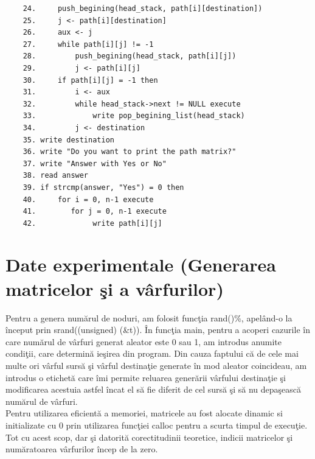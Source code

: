 \documentclass{article}
\begin{document}
\begin{itemize}
\begin{lstlisting}
    24.     push_begining(head_stack, path[i][destination])
    25.     j <- path[i][destination]
    26.     aux <- j
    27.     while path[i][j] != -1
    28.         push_begining(head_stack, path[i][j])
    29.         j <- path[i][j]
    30.     if path[i][j] = -1 then
    31.         i <- aux
    32.         while head_stack->next != NULL execute
    33.             write pop_begining_list(head_stack)
    34.         j <- destination
    35. write destination
    36. write "Do you want to print the path matrix?"
    37. write "Answer with Yes or No"
    38. read answer
    39. if strcmp(answer, "Yes") = 0 then
    40.     for i = 0, n-1 execute
    41.        for j = 0, n-1 execute
    42.             write path[i][j]
    \end{lstlisting}
\end{itemize}
\section{Date experimentale (Generarea matricelor \c{s}i a v\^{a}rfurilor)}
Pentru a genera num\u{a}rul de noduri, am folosit func\c{t}ia rand()\%, apel\^{a}nd-o la \^{i}nceput prin srand((unsigned) (&t)). \^{I}n func\c{t}ia main, pentru a acoperi cazurile \^{i}n care num\u{a}rul de v\^{a}rfuri generat aleator este 0 sau 1, am introdus anumite condi\c{t}ii, care determin\u{a} ie\c{s}irea din program. Din cauza faptului c\u{a} de cele mai multe ori v\^{a}rful surs\u{a} \c{s}i v\^{a}rful destina\c{t}ie generate \^{i}n mod aleator coincideau, am introdus o etichet\u{a} care \^{i}mi permite reluarea gener\u{a}rii v\^{a}rfului destina\c{t}ie \c{s}i modificarea acestuia astfel \^{i}ncat el s\u{a} fie diferit de cel surs\u{a} \c{s}i s\u{a} nu depa\c{s}easc\u{a} num\u{a}rul de v\^{a}rfuri.\\
Pentru utilizarea eficient\u{a} a memoriei, matricele au fost alocate dinamic si initializate cu 0 prin utilizarea func\c{t}iei calloc pentru a scurta timpul de execu\c{t}ie. Tot cu acest scop, dar \c{s}i datorit\u{a} corectitudinii teoretice, indicii matricelor \c{s}i num\u{a}ratoarea v\^{a}rfurilor \^{i}ncep de la zero.\\
\end{document}
